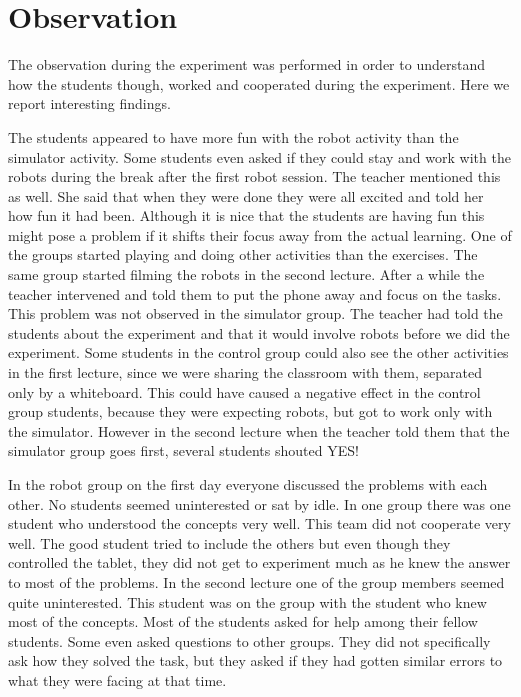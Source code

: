 \section{Observation}
The observation during the experiment was performed in order to understand how the students though, worked and cooperated during the experiment. Here we report interesting findings.

\bigskip\noindent
The students appeared to have more fun with the robot activity than the simulator activity. 
Some students even asked if they could stay and work with the robots during the break after the first robot session. 
The teacher mentioned this as well. She said that when they were done they were all excited and told her how fun it had been. Although it is nice that the students are having fun this might pose a problem if it shifts their focus away from the actual learning. One of the groups started playing and doing other activities than the exercises. The same group started filming the robots in the second lecture. After a while the teacher intervened and told them to put the phone away and focus on the tasks. This problem was not observed in the simulator group. 
The teacher had told the students about the experiment and that it would involve robots before we did the experiment. 
Some students in the control group could also see the other activities in the first lecture, since we were sharing the classroom with them, separated only by a whiteboard.
This could have caused a negative effect in the control group students, because they were expecting robots, but got to work only with the simulator. 
However in the second lecture when the teacher told them that the simulator group goes first, several students shouted YES! 

\bigskip\noindent
In the robot group on the first day everyone discussed the problems with each other. No students seemed uninterested or sat by idle. In one group there was one student who understood the concepts very well. This team did not cooperate very well. The good student tried to include the others but even though they controlled the tablet, they did not get to experiment much as he knew the answer to most of the problems. In the second lecture one of the group members seemed quite uninterested. This student was on the group with the student who knew most of the concepts. Most of the students asked for help among their fellow students. Some even asked questions to other groups. They did not specifically ask how they solved the task, but they asked if they had gotten similar errors to what they were facing at that time.

